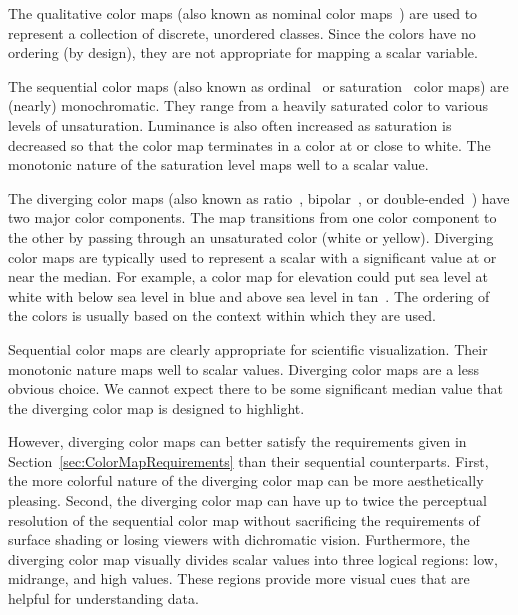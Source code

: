 \documentclass{acmsiggraph}               %
\newcommand{\lcite}[1]{~\cite{#1}}
\begin{document}
The qualitative color maps (also known as nominal color maps\lcite{Ware04})
are used to represent a collection of discrete, unordered classes.  Since
the colors have no ordering (by design), they are not appropriate for
mapping a scalar variable.

The sequential color maps (also known as ordinal\lcite{Ware04} or
saturation\lcite{Rheingans99} color maps) are (nearly) monochromatic.  They
range from a heavily saturated color to various levels of unsaturation.
Luminance is also often increased as saturation is decreased so that the
color map terminates in a color at or close to white.  The monotonic nature
of the saturation level maps well to a scalar value.

The diverging color maps (also known as ratio\lcite{Ware04},
bipolar\lcite{Spence01}, or double-ended\lcite{Rheingans99}) have two major
color components.  The map transitions from one color component to the
other by passing through an unsaturated color (white or yellow).  Diverging
color maps are typically used to represent a scalar with a significant
value at or near the median.  For example, a color map for elevation could
put sea level at white with below sea level in blue and above sea level in
tan\lcite{Tufte97}.  The ordering of the colors is usually based on the
context within which they are used.

Sequential color maps are clearly appropriate for scientific visualization.
Their monotonic nature maps well to scalar values.  Diverging color maps
are a less obvious choice.  We cannot expect there to be some significant
median value that the diverging color map is designed to highlight.

However, diverging color maps can better satisfy the requirements given in
Section~\ref{sec:ColorMapRequirements} than their sequential counterparts.
First, the more colorful nature of the diverging color map can be more
aesthetically pleasing.  Second, the diverging color map can have up to
twice the perceptual resolution of the sequential color map without
sacrificing the requirements of surface shading or losing viewers
with dichromatic vision.  Furthermore, the diverging color map visually
divides scalar values into three logical regions: low, midrange, and high
values.  These regions provide more visual cues that are helpful for
understanding data.
\end{document}
